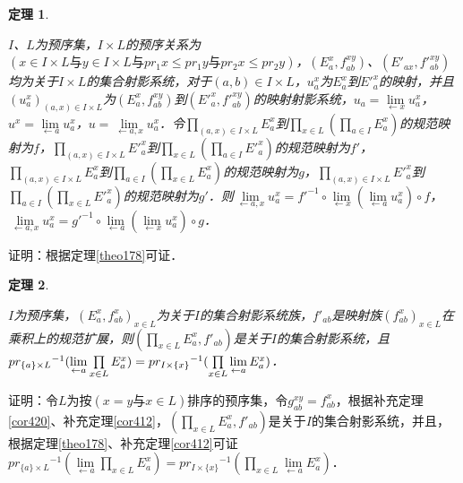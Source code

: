 \documentclass[12pt, a4paper, oneside]{book}
\newtheorem{theo}{定理}
\begin{document}
			\begin{theo}\label{theo179}
				\hfill\par
					$I$、$L$为预序集，$I\times L$的预序关系为$(x\in I\times L\text{与}y\in I\times L\text{与}pr_1x\leq pr_1y\text{与}pr_2x\leq pr_2y)$，$(E_a^x, f_{ab}^{xy})$、$({E'}_{ax}, {f'}_{ab}^{xy})$均为关于$I\times L$的集合射影系统，对于$(a, b)\in I\times L$，$u_a^x$为$E_a^x$到${E'}_a^x$的映射，并且$(u_a^x)_{(a, x)\in I\times L}$为$(E_a^x, f_{ab}^{xy})$到$({E'}_a^x, {f'}_{ab}^{xy})$的映射射影系统，$u_a=\lim\limits_{\gets x}u_a^x$，$u^x=\lim\limits_{\gets a}u_a^x$，$u=\lim\limits_{\gets a, x}u_a^x$．令$\prod\limits_{(a, x)\in I\times L}E_a^x$到$\prod\limits_{x\in L}(\prod\limits_{a\in I}E_a^x)$的规范映射为$f$，$\prod\limits_{(a, x)\in I\times L}{E'}_a^x$到$\prod\limits_{x\in L}(\prod\limits_{a\in I}{E'}_a^x)$的规范映射为$f'$，$\prod\limits_{(a, x)\in I\times L}E_a^x$到$\prod\limits_{a\in I}(\prod\limits_{x\in L}E_a^x)$的规范映射为$g$，$\prod\limits_{(a, x)\in I\times L}{E'}_a^x$到$\prod\limits_{a\in I}(\prod\limits_{x\in L}{E'}_a^x)$的规范映射为$g'$．则$\lim\limits_{\gets a, x}u_a^x={f'}^{-1}\circ \lim\limits_{\gets x}(\lim\limits_{\gets a}u_a^x)\circ f$，$\lim\limits_{\gets a, x}u_a^x={g'}^{-1}\circ \lim\limits_{\gets a}(\lim\limits_{\gets x}u_a^x)\circ g$．
			\end{theo}
			证明：根据定理\ref{theo178}可证．
					
			\begin{theo}\label{theo180}
				\hfill\par
				$I$为预序集，$(E_a^x, f_{ab}^x)_{x\in L}$为关于$I$的集合射影系统族，${f'}_{ab}$是映射族$(f_{ab}^x)_{x\in L}$在乘积上的规范扩展，则$(\prod\limits_{x\in L}E_a^x, {f'}_{ab})$是关于$I$的集合射影系统，且${pr_{\{a\}\times L}}^{-1}(\lim\limits_{\gets a}\prod\limits_{x\in L}E_a^x)=\\{pr_{I\times \{x\}}}^{-1}(\prod\limits_{x\in L}\lim\limits_{\gets a}E_a^x)$．
			\end{theo}
			证明：令$L$为按$(x=y\text{与}x\in L)$排序的预序集，令$g_{ab}^{xy}=f_{ab}^x$，根据补充定理\ref{cor420}、补充定理\ref{cor412}，$(\prod\limits_{x\in L}E_a^x, {f'}_{ab})$是关于$I$的集合射影系统，并且，根据定理\ref{theo178}、补充定理\ref{cor412}可证\\${pr_{\{a\}\times L}}^{-1}(\lim\limits_{\gets a}\prod\limits_{x\in L}E_a^x)={pr_{I\times \{x\}}}^{-1}(\prod\limits_{x\in L}\lim\limits_{\gets a}E_a^x)$．
					
\end{document}
